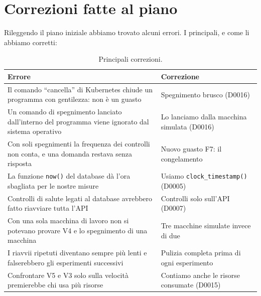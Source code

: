 \chapter{Correzioni fatte al piano}
\label{app:revisione}

Rileggendo il piano iniziale abbiamo trovato alcuni errori. I principali, e come li abbiamo corretti:

\begin{table}[htbp]
\centering
\caption{Principali correzioni.}
\label{tab:correzioni}
\begin{tabularx}{\linewidth}{@{}LL@{}}
\toprule
\textbf{Errore} & \textbf{Correzione} \\
\midrule
Il comando ``cancella'' di Kubernetes chiude un programma con gentilezza: non è un guasto & Spegnimento brusco (D0016) \\
Un comando di spegnimento lanciato dall'interno del programma viene ignorato dal sistema operativo & Lo lanciamo dalla macchina simulata (D0016) \\
Con soli spegnimenti la frequenza dei controlli non conta, e una domanda restava senza risposta & Nuovo guasto F7: il congelamento \\
La funzione \texttt{now()} del database dà l'ora sbagliata per le nostre misure & Usiamo \texttt{clock\_timestamp()} (D0005) \\
Controlli di salute legati al database avrebbero fatto riavviare tutta l'API & Controlli solo sull'API (D0007) \\
Con una sola macchina di lavoro non si potevano provare V4 e lo spegnimento di una macchina & Tre macchine simulate invece di due \\
I riavvii ripetuti diventano sempre più lenti e falserebbero gli esperimenti successivi & Pulizia completa prima di ogni esperimento \\
Confrontare V5 e V3 solo sulla velocità premierebbe chi usa più risorse & Contiamo anche le risorse consumate (D0015) \\
\bottomrule
\end{tabularx}
\end{table}
